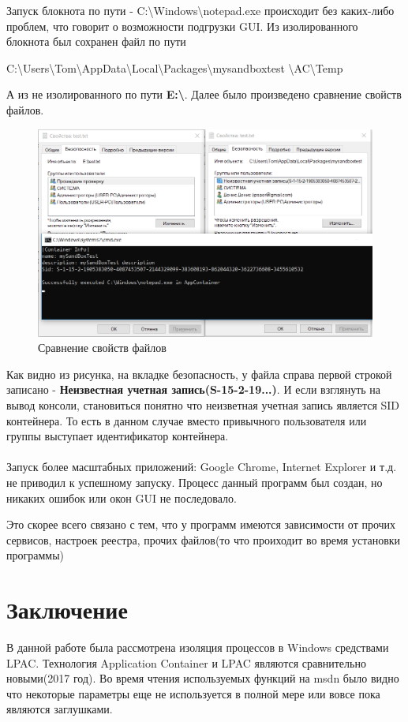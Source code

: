 Запуск блокнота по пути - C:\textbackslash Windows\textbackslash notepad.exe происходит без каких-либо проблем, что говорит о возможности подгрузки GUI.
Из изолированного блокнота был сохранен файл по пути
\begin{center}
C:\textbackslash Users\textbackslash Tom\textbackslash AppData\textbackslash Local\textbackslash Packages\textbackslash mysandboxtest \textbackslash AC\textbackslash Temp
\end{center}
А из не изолированного по пути \textbf{E:\textbackslash}. Далее было произведено сравнение свойств файлов.
\begin{figure}[H]
  \centering
  \includegraphics[width=\textwidth]{img/10}
  \caption{Сравнение свойств файлов}
\end{figure}
Как видно из рисунка, на вкладке безопасность, у файла справа первой строкой записано - \textbf{Неизвестная учетная запись(S-15-2-19...)}. И если взглянуть на вывод консоли, становиться понятно что неизветная учетная запись является SID контейнера. То есть в данном случае вместо привычного пользователя или группы выступает идентификатор контейнера.\\\\
Запуск более масштабных приложений: Google Chrome, Internet Explorer и т.д. не приводил к успешному запуску. Процесс данный программ был создан, но никаких ошибок или окон GUI не последовало.

Это скорее всего связано с тем, что у программ имеются зависимости от прочих сервисов, настроек реестра, прочих файлов(то что проиходит во время установки программы)



\clearpage
{}
\section*{Заключение}
В данной работе была рассмотрена изоляция процессов в Windows средствами LPAC. Технология Application Container и LPAC являются сравнительно новыми(2017 год). Во время чтения используемых функций на msdn было видно что некоторые параметры еще не используется в полной мере или вовсе пока являются заглушками.

